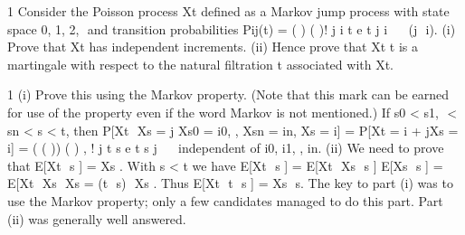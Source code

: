 \documentclass[a4paper,12pt]{article}
\begin{document}
1 Consider the Poisson process Xt defined as a Markov jump process with state space
{0, 1, 2, } and transition probabilities
Pij(t) = ( )
( )!
j i
t e t
j i

 

(j  i).
(i) Prove that Xt has independent increments.
(ii) Hence prove that Xt t is a martingale with respect to the natural filtration t
associated with Xt. 

1 (i) Prove this using the Markov property. (Note that this mark can be earned for
use of the property even if the word Markov is not mentioned.)
If s0 < s1,  < sn < s < t, then
P[Xt  Xs = j
Xs0 = i0, , Xsn = in, Xs = i]
= P[Xt = i + jXs = i] = ( ( )) ( ) ,
!
j
t s e t s
j
   
independent of i0, i1, , in.
(ii) We need to prove that E[Xt  s ] = Xs .
With s < t we have
E[Xt  s ] = E[Xt  Xs  s ] E[Xs  s ]
= E[Xt  Xs  Xs = (t  s)  Xs .
Thus E[Xt  t  s ] = Xs  s.
The key to part (i) was to use the Markov property; only a few candidates managed to do this
part. Part (ii) was generally well answered.
\end{document}
